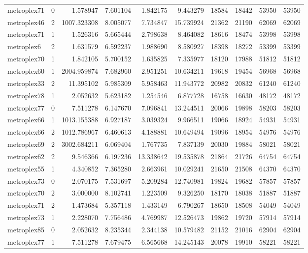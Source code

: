 \begin{longtable}{|l|r|r|r|r|r|r|r|r|r|}
metroplex71 & 0 & 1.578947 & 7.601104 & 1.842175 & 9.443279 & 18584 & 18442 & 53950 & 53950 \\
metroplex46 & 2 & 1007.323308 & 8.005077 & 7.734847 & 15.739924 & 21362 & 21190 & 62069 & 62069 \\
metroplex71 & 1 & 1.526316 & 5.665444 & 2.798638 & 8.464082 & 18616 & 18474 & 53998 & 53998 \\
metroplex6 & 2 & 1.631579 & 6.592237 & 1.988690 & 8.580927 & 18398 & 18272 & 53399 & 53399 \\
metroplex70 & 1 & 1.842105 & 5.700152 & 1.635825 & 7.335977 & 18120 & 17988 & 51812 & 51812 \\
metroplex60 & 1 & 2004.959874 & 7.682960 & 2.951251 & 10.634211 & 19618 & 19454 & 56968 & 56968 \\
metroplex33 & 2 & 11.395102 & 5.985309 & 5.958463 & 11.943772 & 20982 & 20832 & 61240 & 61240 \\
metroplex78 & 1 & 2.052632 & 5.623182 & 1.254546 & 6.877728 & 16758 & 16630 & 48172 & 48172 \\
metroplex77 & 0 & 7.511278 & 6.147670 & 7.096841 & 13.244511 & 20066 & 19898 & 58203 & 58203 \\
metroplex66 & 1 & 1013.155388 & 6.927187 & 3.039324 & 9.966511 & 19066 & 18924 & 54931 & 54931 \\
metroplex66 & 2 & 1012.786967 & 6.460613 & 4.188881 & 10.649494 & 19096 & 18954 & 54976 & 54976 \\
metroplex69 & 2 & 3002.684211 & 6.069404 & 1.767735 & 7.837139 & 20030 & 19884 & 58021 & 58021 \\
metroplex62 & 2 & 9.546366 & 6.197236 & 13.338642 & 19.535878 & 21864 & 21726 & 64754 & 64754 \\
metroplex55 & 1 & 4.340852 & 7.365280 & 2.663961 & 10.029241 & 21650 & 21508 & 64370 & 64370 \\
metroplex73 & 0 & 2.070175 & 7.531697 & 5.209284 & 12.740981 & 19824 & 19682 & 57857 & 57857 \\
metroplex70 & 2 & 3.000000 & 8.102741 & 1.223509 & 9.326250 & 18170 & 18038 & 51887 & 51887 \\
metroplex71 & 2 & 1.473684 & 5.357118 & 1.433149 & 6.790267 & 18650 & 18508 & 54049 & 54049 \\
metroplex73 & 1 & 2.228070 & 7.756486 & 4.769987 & 12.526473 & 19862 & 19720 & 57914 & 57914 \\
metroplex85 & 0 & 2.052632 & 8.235344 & 2.344138 & 10.579482 & 21152 & 21016 & 62904 & 62904 \\
metroplex77 & 1 & 7.511278 & 7.679475 & 6.565668 & 14.245143 & 20078 & 19910 & 58221 & 58221 \\

\end{longtable}
